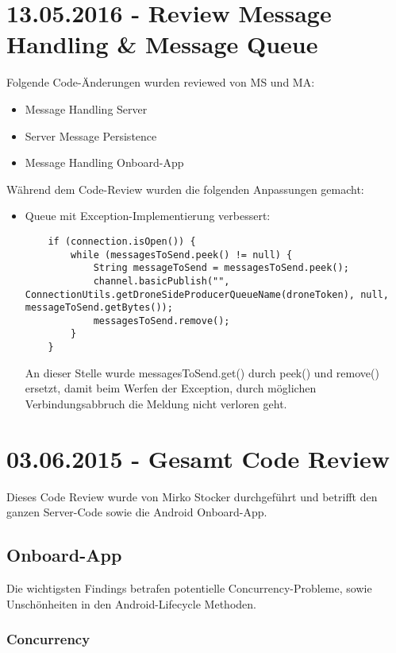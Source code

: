 \section{13.05.2016 - Review Message Handling \& Message Queue}
Folgende Code-Änderungen wurden reviewed von MS und MA:
\begin{itemize}
	\item{Message Handling Server}
	\item{Server Message Persistence}
	\item{Message Handling Onboard-App}
\end{itemize}
Während dem Code-Review wurden die folgenden Anpassungen gemacht:
\begin{itemize}
	\item{Queue mit Exception-Implementierung verbessert:
	\begin{lstlisting}
    if (connection.isOpen()) {
        while (messagesToSend.peek() != null) {
            String messageToSend = messagesToSend.peek();
            channel.basicPublish("", ConnectionUtils.getDroneSideProducerQueueName(droneToken), null, messageToSend.getBytes());
            messagesToSend.remove();
        }
    }
	\end{lstlisting}
	An dieser Stelle wurde messagesToSend.get() durch peek() und remove() ersetzt, damit beim Werfen der Exception, durch möglichen Verbindungsabbruch die Meldung nicht verloren geht.}

\end{itemize}

\newpage
\section{03.06.2015 - Gesamt Code Review}

Dieses Code Review wurde von Mirko Stocker durchgeführt und betrifft den ganzen Server-Code sowie die Android Onboard-App.

\subsection{Onboard-App}
	 
Die wichtigsten Findings betrafen potentielle Concurrency-Probleme, sowie Unschönheiten in den Android-Lifecycle Methoden.

\subsubsection{Concurrency}

